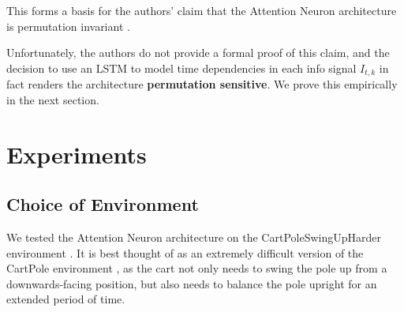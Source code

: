 \documentclass{article}
\newtheorem{theorem}{Theorem}
\begin{document}
This forms a basis for the authors' claim that the Attention Neuron architecture is permutation invariant
\cite{Tang-and-Ha-2021}.

Unfortunately, the authors do not provide a formal proof of this claim,
and the decision to use an LSTM to model time dependencies
in each info signal $I_{t,k}$ in fact renders the architecture 
\textbf{permutation sensitive}. We prove this empirically in the next section.






\section{Experiments}

\subsection{Choice of Environment}
We tested the Attention Neuron architecture on the CartPoleSwingUpHarder environment \cite{Freeman-et-al-2019}.
It is best thought of as an extremely difficult version of the CartPole environment \cite{Towers-et-al-2024, Sutton-and-Barto-1998},
as the cart not only needs to swing the pole up from a downwards-facing position, but also needs to balance the pole upright
for an extended period of time.
\end{document}
